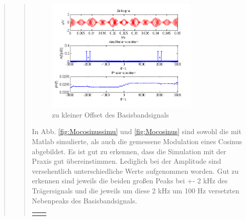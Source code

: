 \begin{quote}
\begin{quote}
	 \begin{figure}[H]
		\begin{center}
			\includegraphics[width=0.8\textwidth]{Bilder/Cos_zukleinerOffset}
		\end{center}
		\caption{zu kleiner Offset des Basisbandsignals}
		\label{fig:Offs}
	\end{figure}
        
        In Abb. \ref{fig:Mocosinussimu} und \ref{fig:Mocosinus} sind sowohl die
        mit Matlab simulierte, als auch die gemessene Modulation eines Cosinus
        abgebildet. Es ist gut zu erkennen, dass die Simulation mit der Praxis
        gut übereinstimmen. Lediglich bei der Amplitude sind versehentlich
        unterschiedliche Werte aufgenommen worden.
        Gut zu erkennen sind jeweils die beiden großen Peaks bei +- 2 kHz des
        Trägersignals und die jeweils um diese 2 kHz um 100 Hz versetzten
        Nebenpeaks des Basisbandsignals.
        
        \begin{center}
        \begin{tabular}{ll}
        
        \hspace{-5cm}
            \begin{minipage}{0.6\textwidth}
                

\end{minipage}
\end{tabular}
\end{center}
\end{quote}
\end{quote}
